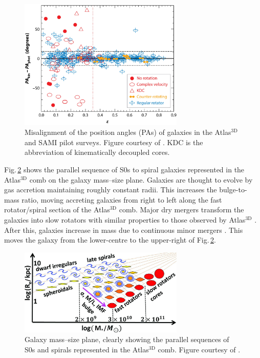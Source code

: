 	\begin{figure}
		\centering
		\includegraphics[width=0.7\textwidth]{introduction/misalignment.jpg}
		\caption[The kinematic--photometric misalignment in slow rotators]{Misalignment of the position angles (PAs) of galaxies in the Atlas$^\text{3D}$ and SAMI pilot surveys. Figure courtesy of \citet{Cappellari2016}. KDC is the abbreviation of kinematically decoupled cores.}
		\label{fig:Misalignment}
	\end{figure}

	Fig.\,\ref{fig:MassRe} shows the parallel sequence of S0s to spiral galaxies represented in the Atlas$^\text{3D}$ comb on the galaxy mass--size plane. Galaxies are thought to evolve by gas accretion maintaining roughly constant radii. This increases the bulge-to-mass ratio, moving accreting galaxies from right to left along the fast rotator/spiral section of the Atlas$^\text{3D}$ comb. Major dry mergers transform the galaxies into slow rotators \citep[e.g.][]{Bendo2000} with similar properties to those observed by Atlas$^\text{3D}$ \citep[e.g.][]{Jesseit2007, Jesseit2009}. After this, galaxies increase in mass due to continuous minor mergers \citep[e.g.][]{DeLucia2007, Genel2008, Feldmann2010, Oser2010, Feldmann2011, Hirschmann2012}. This moves the galaxy from the lower-centre to the upper-right of Fig.\,\ref{fig:MassRe}. 

	\begin{figure}
		\centering
		\includegraphics[width=0.7\textwidth]{introduction/mass_Re.jpg}
		\caption[The galaxy mass--size plane]{Galaxy mass--size plane, clearly showing the parallel sequences of S0s and spirals represented in the Atlas$^\text{3D}$ comb. Figure courtesy of \citet{Cappellari2013a}.}
		\label{fig:MassRe}
	\end{figure}

